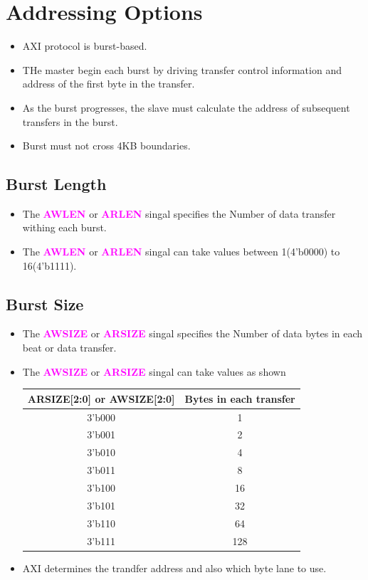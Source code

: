 \documentclass{article}
\newcommand{\AXISignals}[1]{\textbf{\textcolor{magenta}{#1}}}
\begin{document}
\section{Addressing Options}
\begin{itemize}
    \item AXI protocol is burst-based.
    \item THe master begin each burst by driving transfer control information and address of the first byte in the transfer.
    \item As the burst progresses, the slave must calculate the address of subsequent transfers in the burst.
    \item Burst must not cross 4KB boundaries.
\end{itemize}

\subsection{Burst Length}
\begin{itemize}
    \item The \AXISignals{AWLEN} or \AXISignals{ARLEN} singal specifies the Number of data transfer withing each burst.
    \item The \AXISignals{AWLEN} or \AXISignals{ARLEN} singal can take values between 1(4'b0000) to 16(4'b1111).
\end{itemize}

\subsection{Burst Size}
\begin{itemize}
    \item The \AXISignals{AWSIZE} or \AXISignals{ARSIZE} singal specifies the Number of data bytes in each beat or data transfer.
    \item The \AXISignals{AWSIZE} or \AXISignals{ARSIZE} singal can take values as shown
       
    \begin{center}
        \begin{tabular}{c|c}
            \textbf{ARSIZE[2:0]} or \textbf{AWSIZE[2:0]} & \textbf{Bytes in each transfer}\\
            \hline
            3'b000 & 1\\
            3'b001 & 2\\
            3'b010 & 4\\
            3'b011 & 8\\
            3'b100 & 16\\
            3'b101 & 32\\
            3'b110 & 64\\
            3'b111 & 128\\
        \end{tabular}
    \end{center}
    \item AXI determines the trandfer address and also which byte lane to use.
\end{itemize}
\end{document}
